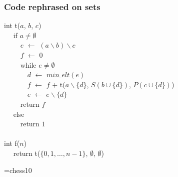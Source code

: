 \documentclass[compress]{beamer}
\newcommand{\kw}[1]{{\color{blue}#1}}
\newcommand{\minelt}[1]{\ensuremath{\mathit{min\_elt}(#1)}}
\begin{document}
\begin{frame}
  \frametitle{Code rephrased on sets}
{\tt\begin{obeylines}
  int t($a$, $b$, $c$) \\
  ~~ \kw{if} $a \not= \emptyset$ \\
  ~~~~ $e$ $\leftarrow$ $(a \backslash  b) \backslash c$ \\
  ~~~~ $f$ $\leftarrow$ 0 \\
  ~~~~ \kw{while} $e \not=\emptyset$ \\
  ~~~~~~ $d$ $\leftarrow$ $\minelt{e}$ \\
  ~~~~~~ $f$ $\leftarrow$ $f$ $+$ t($a\backslash \{d\}$, $S(b\cup\{d\})$, $P(c\cup\{d\})$) \\
  ~~~~~~ $e$ $\leftarrow$ $e \backslash  \{d\}$ \\
  ~~~~ \kw{return} $f$ \\
  ~~ \kw{else} \\
  ~~~~ \kw{return} $1$ \\
  ~~ \\
  int f($n$) \\
  ~~ \kw{return} t($\{0,1,\dots,n-1\}$, $\emptyset$, $\emptyset$)
\end{obeylines}}
\end{frame}

\font\Chess=chess10
\newcommand{\qw}{\vrule height 1.5em width 0pt{\Chess Q}}
\newcommand{\qb}{\vrule height 1.5em width 0pt{\Chess q}}
\newcommand{\qr}{\vrule height 1.5em width 0pt{\color{red}\Chess q}}
\newcommand{\vide}{\vrule height 1.5em width 0pt\phantom{\Chess q}}
\newcommand{\qm}{\vrule height 1.5em width 0pt\hfil?\hfil}
\end{document}
